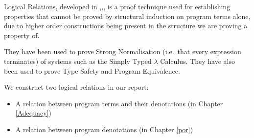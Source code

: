 Logical Relations, developed in \citep{Tait67},\citep{Plotkin73},\citep{Statman85}, is a proof technique used for establishing properties that cannot be proved by structural induction on program terms alone, due to higher order constructions being present in the structure we are proving a property of.

They have been used to prove Strong Normalisation (i.e.\ that every expression terminates) of systems such as the Simply Typed $\lambda$ Calculus. They have also been used to prove Type Safety and Program Equivalence.

We construct two logical relations in our report:

\begin{itemize}
\item{A relation between program terms and their denotations (in Chapter \ref{Adequacy})}
\item{A relation between program denotations (in Chapter \ref{por})}
\end{itemize}


%
%
%
%

